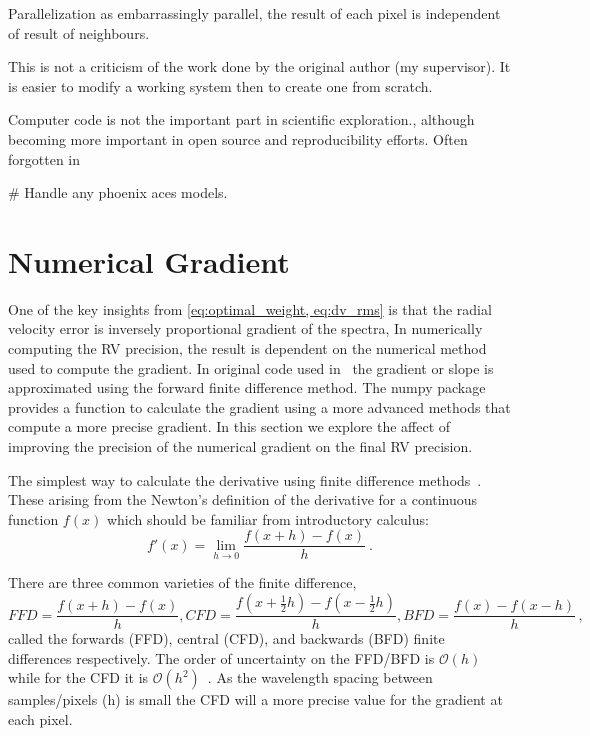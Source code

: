 Parallelization as embarrassingly parallel, the result of each pixel is independent of result of neighbours.

This is not a criticism of the work done by the original author (my supervisor).
It is easier to modify a working system then to create one from scratch.

Computer code is not the important part in scientific exploration., although becoming more important in open source and reproducibility efforts.
Often forgotten in

\# Handle any phoenix aces models.


\section{Numerical Gradient}
\label{sec:numerical_gradient}
One of the key insights from \cref{eq:optimal_weight, eq:dv_rms} is that the radial velocity error is inversely proportional gradient of the spectra, In numerically computing the {RV} precision, the result is dependent on the numerical method used to compute the gradient.
In original code used in~\citet{figueira_radial_2016} the gradient or slope is approximated using the forward finite difference method.
The numpy package provides a function to calculate the gradient using a more advanced methods that compute a more precise gradient.
In this section we explore the affect of improving the precision of the numerical gradient on the final {RV} precision.

The simplest way to calculate the derivative using finite difference methods~\citep{quarteroni_numerical_2000}.
These arising from the Newton's definition of the derivative for a continuous function \(f(x)\) which should be familiar from introductory calculus:
\[f'(x) = \lim_{h \to 0} \frac{f(x+h)-f(x)}{h}~.\]

There are three common varieties of the finite difference,
\begin{equation}
 {FFD} = \frac{f(x+h)-f(x)}{h},  {CFD}=\frac{f(x+\frac{1}{2}h)-f(x-\frac{1}{2}h)}{h}, {BFD}=\frac{f(x)-f(x-h)}{h}\,,
\end{equation}
called the forwards ({FFD}), central ({CFD}), and backwards ({BFD}) finite differences respectively.
The order of uncertainty on the {FFD}/{BFD} is \(\mathcal{O}(h)\) while for the {CFD} it is \(\mathcal{O}({h}^{2})\)~\citep{quarteroni_numerical_2000}.
As the wavelength spacing between samples/pixels (h) is small the {CFD} will a more precise value for the gradient at each pixel.

